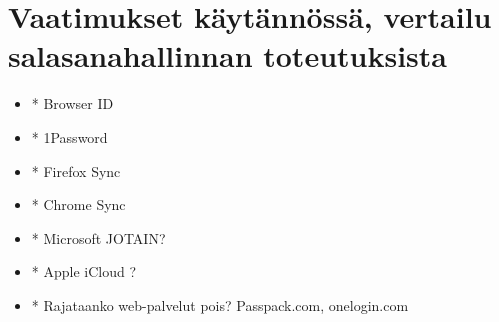 \documentclass[english,gradu]{tktltiki}
\begin{document}







\section{Vaatimukset käytännössä, vertailu salasanahallinnan toteutuksista} %
\label{sec:käytännön_1password}
\begin{itemize}

  \item * Browser ID
  \item * 1Password
  \item * Firefox Sync
  \item * Chrome Sync
  \item * Microsoft JOTAIN?
  \item * Apple iCloud ?
  \item * Rajataanko web-palvelut pois? Passpack.com, onelogin.com

\end{itemize}
\end{document}
